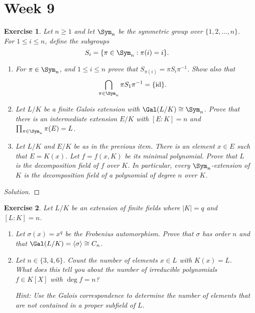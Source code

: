 \documentclass[a4paper,10pt,reqno]{amsart}
\newtheorem{ex}{Exercise}[section]
\newenvironment{sol}
  {\renewcommand\qedsymbol{$\blacksquare$}\begin{proof}[Solution]}
  {\end{proof}}
\begin{document}
\section{Week 9}
\begin{ex}
\label{9.1}
Let $n \geq 1$ and let $\Sym_n$ be the symmetric group over $\{1, 2, \ldots, n \}$. For $1 \leq i \leq n$, define the subgroups
\[
S_i = \{ \pi \in \Sym_n : \pi(i) = i \}.
\]
\begin{enumerate}[label=(\roman*)]
\item For $\pi \in \Sym_n$, and $1 \leq i \leq n$ prove that $S_{\pi(i)} = \pi S_i\pi^{-1}$. Show also that
\[
\bigcap_{\pi \in \Sym_n} \pi S_1\pi^{-1} = \{ \mathrm{id} \}.
\]
\item Let $L/K$ be a finite Galois extension with $\Gal(L/K) \cong \Sym_n$. Prove that there is an intermediate extension $E/K$ with $[E:K] = n$ and $\prod_{\pi \in \Sym_n} \pi(E) = L$.
\item Let $L/K$ and $E/K$ be as in the previous item. There is an element $x \in E$ such that $E = K(x)$. Let $f = f(x,K)$ be its minimal polynomial. Prove that $L$ is the decomposition field of $f$ over $K$. In particular, every $\Sym_n$-extension of $K$ is the decomposition field of a polynomial of degree $n$ over $K$.
\end{enumerate}

\end{ex}
\begin{sol}
    
\end{sol}

\begin{ex}
\label{9.2}
    Let $L/K$ be an extension of finite fields where $|K| = q$ and $[L:K] = n$.
\begin{enumerate}[label=(\roman*)]
\item Let $\sigma(x) = x^q$ be the Frobenius automorphism. Prove that $\sigma$ has order $n$ and that $\Gal(L/K) = \left\langle \sigma \right\rangle \cong C_n$.
\item Let $n \in \{3,4,6\}$. Count the number of elements $x \in L$ with $K(x) = L$. What does this tell you about the number of irreducible polynomials $f \in K[X]$ with $\deg f = n$?

\noindent \textit{Hint:} Use the Galois correspondence to determine the number of elements that are not contained in a proper subfield of $L$.
\end{enumerate} 
\end{ex}
\end{document}
